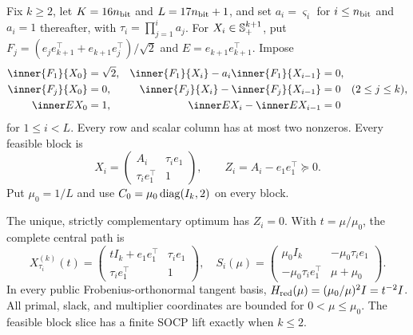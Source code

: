 Fix $k\geq2$, let $K=16n_{\rm bit}$ and $L=17n_{\rm bit}+1$, and set
$a_i=\varsigma_i$ for $i\leq n_{\rm bit}$ and $a_i=1$ thereafter, with
$\tau_i=\prod_{j=1}^ia_j$.  For $X_i\in\mathbb{S}_{+}^{k+1}$, put
$F_j=(e_je_{k+1}^\top+e_{k+1}e_j^\top)/\sqrt2$ and
$E=e_{k+1}e_{k+1}^\top$.  Impose
\begin{align}
 \inner{F_1}{X_0}&=\sqrt2,&
 \inner{F_1}{X_i}-a_i\inner{F_1}{X_{i-1}}&=0,\nonumber\\
 \inner{F_j}{X_0}&=0,&
 \inner{F_j}{X_i}-\inner{F_j}{X_{i-1}}&=0\quad(2\leq j\leq k),\nonumber\\
 \inner E{X_0}&=1,&
 \inner E{X_i}-\inner E{X_{i-1}}&=0                       \label{eq:sdp-schur-chains}
\end{align}
for $1\leq i<L$.  Every row and scalar column has at most two
nonzeros.  Every feasible block is
\begin{equation}
 X_i=\begin{pmatrix}A_i&\tau_i e_1\\\tau_i e_1^\top&1\end{pmatrix},
 \qquad Z_i=A_i-e_1e_1^\top\succeq0.                          \label{eq:sdp-schur-map}
\end{equation}
Put $\mu_0=1/L$ and use $C_0=\mu_0\operatorname{diag}(I_k,2)$ on every block.

\begin{theorem}
\label{thm:sdp-schur}
The unique, strictly complementary optimum has $Z_i=0$.
With $t=\mu/\mu_0$, the complete central path is
\begin{equation}
 X_{\tau_i}^{(k)}(t)=
 \begin{pmatrix}tI_k+e_1e_1^\top&\tau_i e_1\\\tau_i e_1^\top&1\end{pmatrix},
 \quad S_i(\mu)=
 \begin{pmatrix}\mu_0I_k&-\mu_0\tau_i e_1\\
 -\mu_0\tau_i e_1^\top&\mu+\mu_0\end{pmatrix}.              \label{eq:sdp-schur-path}
\end{equation}
In every public Frobenius-orthonormal tangent basis,
$H_{\rm red}(\mu)=(\mu_0/\mu)^2I=t^{-2}I$.  All primal, slack, and multiplier
coordinates are bounded for $0<\mu\leq\mu_0$.  The feasible block slice has
a finite SOCP lift exactly when $k\leq2$.
\end{theorem}

